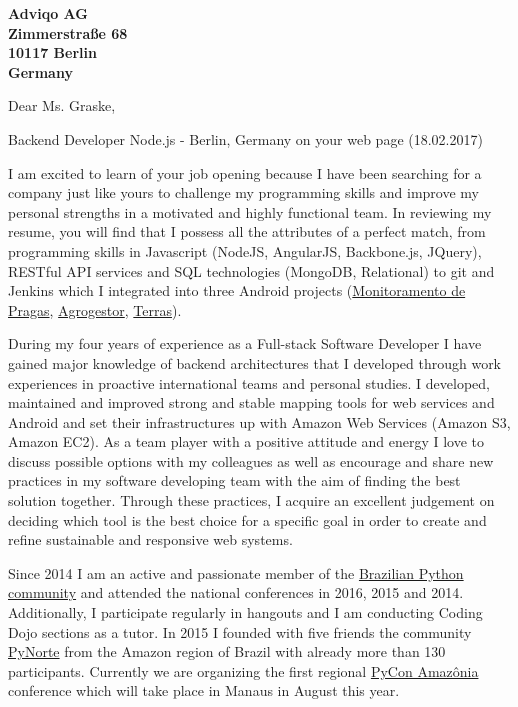 \documentclass[a4paper]{joaosoares-letter}
\begin{document}
\longindentation=0pt


\begin{letter}{\bfseries Adviqo AG\\Zimmerstraße 68\\10117 Berlin\\Germany}


\date{Belém, \today}


\opening{Dear Ms. Graske,}{Backend Developer Node.js - Berlin, Germany on your web page (18.02.2017)}

I am excited to learn of your job opening because I have been searching for a company just like yours to challenge my programming skills and improve my personal strengths in a motivated and highly functional team. In reviewing my resume, you will find that I possess all the attributes of a perfect match, from programming skills in Javascript (NodeJS, AngularJS, Backbone.js, JQuery), RESTful API services and SQL technologies (MongoDB, Relational) to git and Jenkins which I integrated into three Android projects (\href{https://goo.gl/RcdbHk}{Monitoramento de Pragas}, \href{https://goo.gl/mycBmL}{Agrogestor}, \href{https://goo.gl/OyZXke}{Terras}).

During my four years of experience as a Full-stack Software Developer I have gained major knowledge of backend architectures that I developed through work experiences in proactive international teams and personal studies. I developed, maintained and improved strong and stable mapping tools for web services and Android and set their infrastructures up with Amazon Web Services (Amazon S3, Amazon EC2). As a team player with a positive attitude and energy I love to discuss possible options with my colleagues as well as encourage and share new practices in my software developing team with the aim of finding the best solution together. Through these practices, I acquire an excellent judgement on deciding which tool is the best choice for a specific goal in order to create and refine sustainable and responsive web systems.

Since 2014 I am an active and passionate member of the \href{http://python.org.br}{Brazilian Python community} and attended the national conferences in 2016, 2015 and 2014. Additionally, I participate regularly in hangouts and I am conducting Coding Dojo sections as a tutor. In 2015 I founded with five friends the community \href{http://pynorte.python.org.br}{PyNorte} from the Amazon region of Brazil with already more than 130 participants. Currently we are organizing the first regional \href{http://amazonia.python.org.br/}{PyCon Amazônia} conference which will take place in Manaus in August this year.


\end{letter}
\end{document}
